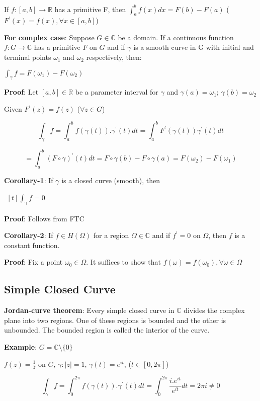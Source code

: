 \documentclass{article}
\begin{document}
\begin{flushleft}
If $f:[a,b]\rightarrow \mathds{R}$ has a primitive F, then $\int_{a}^{b} f(x) dx =F(b)-F(a)$ \: ($F^{'}(x)=f(x), \forall x\in [a,b]$)

\textbf{For complex case}: Suppose $G\in \mathds{C}$ be a domain. If a continuous function $f:G\rightarrow \mathds{C}$ has a primitive $F$ on $G$ and if $\gamma$ is a smooth curve in G with initial and terminal points $\omega_1$ and $\omega_2$ respectively, then:

$\int_{\gamma}^{} f = F(\omega_1) - F(\omega_2)$

\textbf{Proof}: Let $[a,b]\in \mathds{R}$ be a parameter interval for $\gamma$ and $\gamma(a)=\omega_1$; $\gamma(b)=\omega_2$

Given $F^{'}(z)=f(z)$   ($\forall z \in G$)

$$\int_{\gamma}^{} f = \int_{a}^{b} f(\gamma(t)).\gamma^{'}(t) dt = \int_{a}^{b} F^{'}(\gamma(t))\gamma^{'}(t) dt$$

$$= \int_{a}^{b} (F \circ \gamma)^{'}(t) dt = F \circ \gamma(b)-F \circ \gamma(a)= F(\omega_2)-F(\omega_1)$$

\textbf{Corollary-1}: If $\gamma$ is a closed curve (smooth), then

$\begin{aligned}[t] \int_{\gamma}^{} f =0\nonumber \end{aligned}$ 

\textbf{Proof}: Follows from FTC

\textbf{Corollary-2}: If $f\in H(\Omega)$ for a region $\Omega\in \mathds{C}$ and if $f^{'}=0$ on $\Omega$, then $f$ is a constant function.

\textbf{Proof}: Fix a point $\omega_0\in \Omega$. It suffices to show that $f(\omega)=f(\omega_0), \forall \omega \in \Omega$

\subsection{\textbf{Simple Closed Curve}}

\textbf{Jordan-curve theorem}: Every simple closed curve in $\mathds{C}$ divides the complex plane into two regions. One of these regions is bounded and the other is unbounded. The bounded region is called the interior of the curve.

\textbf{Example}: $G=\mathds{C}\setminus \{0\}$

$f(z)=\frac{1}{z}$ on $G$, $\gamma: |z|=1$, $\gamma(t)=e^{it}$, ($t\in [0,2\pi]$)

$$\int_{\gamma}^{} f= \int_{0}^{2\pi} f(\gamma(t)).\gamma^{'}(t) dt= \int_{0}^{2\pi} \frac{i.e^{it}}{e^{it}} dt =2\pi i\neq 0$$


\end{flushleft}
\end{document}
